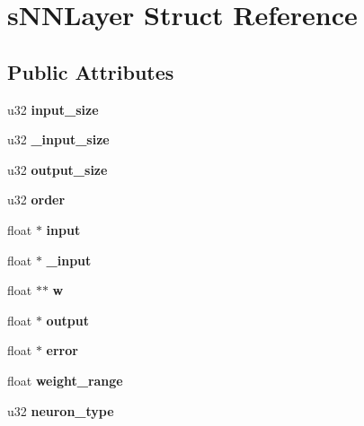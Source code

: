 \hypertarget{structsNNLayer}{\section{s\-N\-N\-Layer Struct Reference}
\label{structsNNLayer}
}
\subsection*{Public Attributes}
\begin{DoxyCompactItemize}
\item 
\hypertarget{structsNNLayer_a39671ebb687538cad1faa9f4f2fb56f8}{u32 {\bfseries input\-\_\-size}}\label{structsNNLayer_a39671ebb687538cad1faa9f4f2fb56f8}

\item 
\hypertarget{structsNNLayer_ac7b939bb9db7f36934bb1bf4c98d4cf3}{u32 {\bfseries \-\_\-input\-\_\-size}}\label{structsNNLayer_ac7b939bb9db7f36934bb1bf4c98d4cf3}

\item 
\hypertarget{structsNNLayer_aa0e6b38d5cdb5472c2a6fd38ba3cce61}{u32 {\bfseries output\-\_\-size}}\label{structsNNLayer_aa0e6b38d5cdb5472c2a6fd38ba3cce61}

\item 
\hypertarget{structsNNLayer_a2786af56ba6dd2cdb1c6b41dee628c3f}{u32 {\bfseries order}}\label{structsNNLayer_a2786af56ba6dd2cdb1c6b41dee628c3f}

\item 
\hypertarget{structsNNLayer_a6615b9379c48cff23c0fc7bc92614252}{float $\ast$ {\bfseries input}}\label{structsNNLayer_a6615b9379c48cff23c0fc7bc92614252}

\item 
\hypertarget{structsNNLayer_aefbe1fdae7c6c78988da5ec1de5aa748}{float $\ast$ {\bfseries \-\_\-input}}\label{structsNNLayer_aefbe1fdae7c6c78988da5ec1de5aa748}

\item 
\hypertarget{structsNNLayer_aa16baf629e32b388f4798f7a381e8edf}{float $\ast$$\ast$ {\bfseries w}}\label{structsNNLayer_aa16baf629e32b388f4798f7a381e8edf}

\item 
\hypertarget{structsNNLayer_aaf74d7dc9c777358051ade70be8354bb}{float $\ast$ {\bfseries output}}\label{structsNNLayer_aaf74d7dc9c777358051ade70be8354bb}

\item 
\hypertarget{structsNNLayer_a1350a2df8b3030aace58189145c154ff}{float $\ast$ {\bfseries error}}\label{structsNNLayer_a1350a2df8b3030aace58189145c154ff}

\item 
\hypertarget{structsNNLayer_affeefed95f5500cb10678b0ab91fcf61}{float {\bfseries weight\-\_\-range}}\label{structsNNLayer_affeefed95f5500cb10678b0ab91fcf61}

\item 
\hypertarget{structsNNLayer_abb9e00388cf8220ce986ce82b934d40c}{u32 {\bfseries neuron\-\_\-type}}\label{structsNNLayer_abb9e00388cf8220ce986ce82b934d40c}

\end{DoxyCompactItemize}


